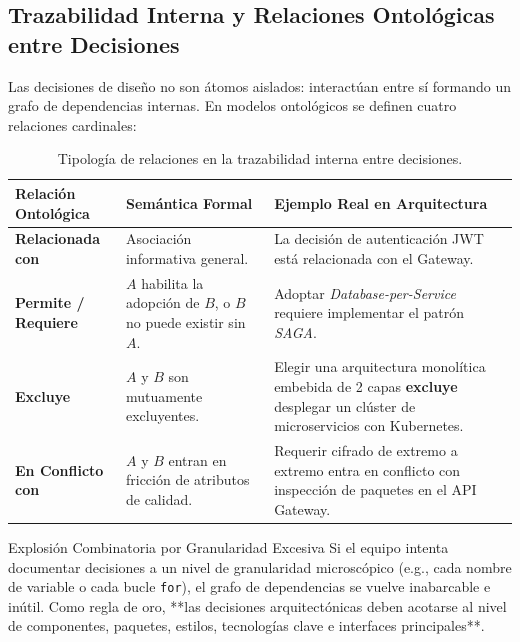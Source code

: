 \subsection{Trazabilidad Interna y Relaciones Ontológicas entre Decisiones}

Las decisiones de diseño no son átomos aislados: interactúan entre sí formando un grafo de dependencias internas. En modelos ontológicos se definen cuatro relaciones cardinales:

\begin{table}[htbp]
\centering
\small
\begin{tabularx}{\textwidth}{l p{3.5cm} X}
\toprule
\textbf{Relación Ontológica} & \textbf{Semántica Formal} & \textbf{Ejemplo Real en Arquitectura} \\
\midrule
\textbf{Relacionada con} & Asociación informativa general. & La decisión de autenticación JWT está relacionada con el Gateway. \\
\addlinespace
\textbf{Permite / Requiere} & $A$ habilita la adopción de $B$, o $B$ no puede existir sin $A$. & Adoptar \emph{Database-per-Service} requiere implementar el patrón \emph{SAGA}. \\
\addlinespace
\textbf{Excluye} & $A$ y $B$ son mutuamente excluyentes. & Elegir una arquitectura monolítica embebida de 2 capas \textbf{excluye} desplegar un clúster de microservicios con Kubernetes. \\
\addlinespace
\textbf{En Conflicto con} & $A$ y $B$ entran en fricción de atributos de calidad. & Requerir cifrado de extremo a extremo entra en conflicto con inspección de paquetes en el API Gateway. \\
\bottomrule
\end{tabularx}
\caption{Tipología de relaciones en la trazabilidad interna entre decisiones.}
\label{tab:relaciones-ontologicas}
\end{table}

\begin{antipatron}{Explosión Combinatoria por Granularidad Excesiva}
Si el equipo intenta documentar decisiones a un nivel de granularidad microscópico (e.g., cada nombre de variable o cada bucle \texttt{for}), el grafo de dependencias se vuelve inabarcable e inútil. Como regla de oro, **las decisiones arquitectónicas deben acotarse al nivel de componentes, paquetes, estilos, tecnologías clave e interfaces principales**.
\end{antipatron}

